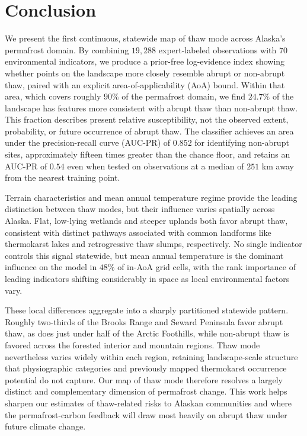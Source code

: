 \documentclass[../main.tex]{subfiles}
\begin{document}
\section{Conclusion}

We present the first continuous, statewide map of thaw mode across Alaska's permafrost domain. By combining $19,288$ expert-labeled observations with 70 environmental indicators, we produce a prior-free log-evidence index showing whether points on the landscape more closely resemble abrupt or non-abrupt thaw, paired with an explicit area-of-applicability (AoA) bound. Within that area, which covers roughly $90\%$ of the permafrost domain, we find $24.7\%$ of the landscape has features more consistent with abrupt thaw than non-abrupt thaw. This fraction describes present relative susceptibility, not the observed extent, probability, or future occurrence of abrupt thaw. The classifier achieves an area under the precision-recall curve (AUC-PR) of $0.852$ for identifying non-abrupt sites, approximately fifteen times greater than the chance floor, and retains an AUC-PR of $0.54$ even when tested on observations at a median of $251$ km away from the nearest training point.

Terrain characteristics and mean annual temperature regime provide the leading distinction between thaw modes, but their influence varies spatially across Alaska. Flat, low-lying wetlands and steeper uplands both favor abrupt thaw, consistent with distinct pathways associated with common landforms like thermokarst lakes and retrogressive thaw slumps, respectively. No single indicator controls this signal statewide, but mean annual temperature is the dominant influence on the model in $48\%$ of in-AoA grid cells, with the rank importance of leading indicators shifting considerably in space as local environmental factors vary.

These local differences aggregate into a sharply partitioned statewide pattern. Roughly two-thirds of the Brooks Range and Seward Peninsula favor abrupt thaw, as does just under half of the Arctic Foothills, while non-abrupt thaw is favored across the forested interior and mountain regions. Thaw mode nevertheless varies widely within each region, retaining landscape-scale structure that physiographic categories and previously mapped thermokarst occurrence potential do not capture. Our map of thaw mode therefore resolves a largely distinct and complementary dimension of permafrost change. This work helps sharpen our estimates of thaw-related risks to Alaskan communities and where the permafrost-carbon feedback will draw most heavily on abrupt thaw under future climate change.
\end{document}
